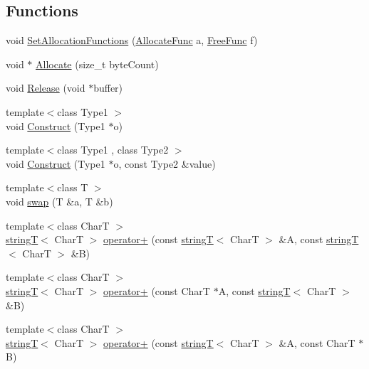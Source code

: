 \subsection*{Functions}
\begin{DoxyCompactItemize}
\item 
void \hyperlink{namespacefm_a08282cf09faa7bc67137a62ba56b329c}{SetAllocationFunctions} (\hyperlink{namespacefm_a97324e93febfca76d5ed574a89c0197d}{AllocateFunc} a, \hyperlink{namespacefm_a9b240a6540d27367231e6fd6d93ec35c}{FreeFunc} f)
\item 
void $\ast$ \hyperlink{namespacefm_a554b71c8980290cf12761186ad36c08a}{Allocate} (size\_\-t byteCount)
\item 
void \hyperlink{namespacefm_ac85d46ada49418f6c4b758bc96f24cbf}{Release} (void $\ast$buffer)
\item 
{\footnotesize template$<$class Type1 $>$ }\\void \hyperlink{namespacefm_abb21e5b6aed1f1af6dd80d0b319c2a93}{Construct} (Type1 $\ast$o)
\item 
{\footnotesize template$<$class Type1 , class Type2 $>$ }\\void \hyperlink{namespacefm_a2f7f76266bc5e32b58c3258289492367}{Construct} (Type1 $\ast$o, const Type2 \&value)
\item 
{\footnotesize template$<$class T $>$ }\\void \hyperlink{namespacefm_a969a63d5081b8d2dce35a096af1fb7d2}{swap} (T \&a, T \&b)
\item 
{\footnotesize template$<$class CharT $>$ }\\\hyperlink{classfm_1_1stringT}{stringT}$<$ CharT $>$ \hyperlink{namespacefm_ae1c519de7f44b9d074f17e65c5f56ee8}{operator+} (const \hyperlink{classfm_1_1stringT}{stringT}$<$ CharT $>$ \&A, const \hyperlink{classfm_1_1stringT}{stringT}$<$ CharT $>$ \&B)
\item 
{\footnotesize template$<$class CharT $>$ }\\\hyperlink{classfm_1_1stringT}{stringT}$<$ CharT $>$ \hyperlink{namespacefm_a6dbe5aa45a2924ca3c57f5655b098338}{operator+} (const CharT $\ast$A, const \hyperlink{classfm_1_1stringT}{stringT}$<$ CharT $>$ \&B)
\item 
{\footnotesize template$<$class CharT $>$ }\\\hyperlink{classfm_1_1stringT}{stringT}$<$ CharT $>$ \hyperlink{namespacefm_a9e42af087b963766af56c8519e2cea66}{operator+} (const \hyperlink{classfm_1_1stringT}{stringT}$<$ CharT $>$ \&A, const CharT $\ast$B)
\item 

\end{DoxyCompactItemize}
